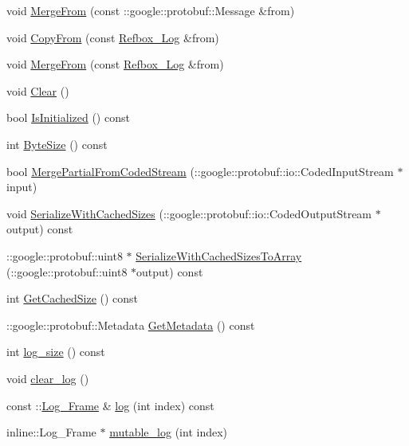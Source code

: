 \begin{DoxyCompactItemize}
void \hyperlink{class_refbox___log_a4897c1848833546d659a52547f04d5f1}{Merge\-From} (const \-::google\-::protobuf\-::\-Message \&from)
\item 
void \hyperlink{class_refbox___log_a7ad8c1071dfdad682c8d76ce7eb477e1}{Copy\-From} (const \hyperlink{class_refbox___log}{Refbox\-\_\-\-Log} \&from)
\item 
void \hyperlink{class_refbox___log_acc3d626b92662e979cd7408b9bd033e2}{Merge\-From} (const \hyperlink{class_refbox___log}{Refbox\-\_\-\-Log} \&from)
\item 
void \hyperlink{class_refbox___log_a131b120d525acc7650652878569edbab}{Clear} ()
\item 
bool \hyperlink{class_refbox___log_a29488f98376bfadb7576fd28df42a9a1}{Is\-Initialized} () const 
\item 
int \hyperlink{class_refbox___log_a3330b909cc11e6b2a54ba65c70c4d885}{Byte\-Size} () const 
\item 
bool \hyperlink{class_refbox___log_a9008a2f74f67a2fcb427461931d367e5}{Merge\-Partial\-From\-Coded\-Stream} (\-::google\-::protobuf\-::io\-::\-Coded\-Input\-Stream $\ast$input)
\item 
void \hyperlink{class_refbox___log_a643f1c57410e68686fbcc343b6583209}{Serialize\-With\-Cached\-Sizes} (\-::google\-::protobuf\-::io\-::\-Coded\-Output\-Stream $\ast$output) const 
\item 
\-::google\-::protobuf\-::uint8 $\ast$ \hyperlink{class_refbox___log_a24c2ab3f3736226ca832c1c0c26648ca}{Serialize\-With\-Cached\-Sizes\-To\-Array} (\-::google\-::protobuf\-::uint8 $\ast$output) const 
\item 
int \hyperlink{class_refbox___log_a80e08f19036f80d1723c6e7d268189df}{Get\-Cached\-Size} () const 
\item 
\-::google\-::protobuf\-::\-Metadata \hyperlink{class_refbox___log_afcebef450a49fccb0aa41f039741f374}{Get\-Metadata} () const 
\item 
int \hyperlink{class_refbox___log_a3ba8b289783c270761268fc6e78d2a0d}{log\-\_\-size} () const 
\item 
void \hyperlink{class_refbox___log_afe410c4cd1654e18daac65680694b5ce}{clear\-\_\-log} ()
\item 
const \-::\hyperlink{class_log___frame}{Log\-\_\-\-Frame} \& \hyperlink{class_refbox___log_ac3473e118a25b6665a029d19d5d9f1cc}{log} (int index) const 
\item 
inline\-::\-Log\-\_\-\-Frame $\ast$ \hyperlink{class_refbox___log_add4eb06bfe385c65eb01e959aa3c5c77}{mutable\-\_\-log} (int index)

\end{DoxyCompactItemize}
